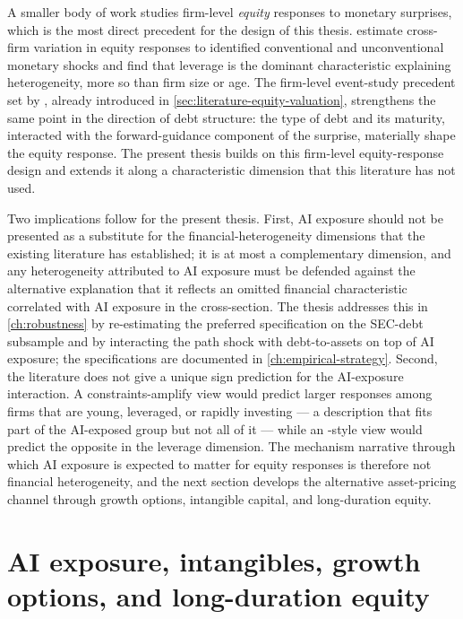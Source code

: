 A smaller body of work studies firm-level \emph{equity} responses to
monetary surprises, which is the most direct precedent for the design
of this thesis.  estimate cross-firm variation in
equity responses to identified conventional and unconventional monetary
shocks and find that leverage is the dominant characteristic explaining
heterogeneity, more so than firm size or age. The firm-level
event-study precedent set by \citet{gurkaynakKarasoyCanLee2022},
already introduced in \cref{sec:literature-equity-valuation},
strengthens the same point in the direction of debt structure: the
type of debt and its maturity, interacted with the forward-guidance
component of the surprise, materially shape the equity response. The
present thesis builds on this firm-level equity-response design and
extends it along a characteristic dimension that this literature has
not used.

Two implications follow for the present thesis. First, AI exposure
should not be presented as a substitute for the financial-heterogeneity
dimensions that the existing literature has established; it is at most
a complementary dimension, and any heterogeneity attributed to AI
exposure must be defended against the alternative explanation that it
reflects an omitted financial characteristic correlated with AI
exposure in the cross-section. The thesis addresses this in
\cref{ch:robustness} by re-estimating the preferred specification on
the SEC-debt subsample and by interacting the path shock with debt-to-assets
on top of AI exposure; the specifications are documented in
\cref{ch:empirical-strategy}. Second, the literature does not give a
unique sign prediction for the AI-exposure interaction. A
constraints-amplify view would predict larger responses among firms
that are young, leveraged, or rapidly investing --- a description that
fits part of the AI-exposed group but not all of it --- while an
\citet{ottonelloWinberry2020}-style view would predict the opposite in
the leverage dimension. The mechanism narrative through which AI
exposure is expected to matter for equity responses is therefore not
financial heterogeneity, and the next section develops the alternative
asset-pricing channel through growth options, intangible capital, and
long-duration equity.

\section{AI exposure, intangibles, growth options, and long-duration equity}
\label{sec:literature-ai-intangibles}

